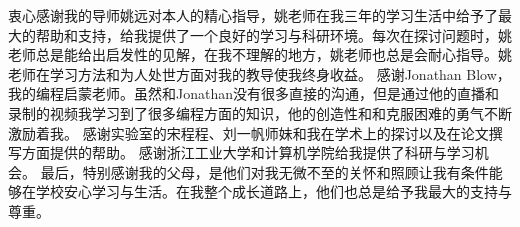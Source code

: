 
\begin{acknowledgements}
衷心感谢我的导师姚远对本人的精心指导，姚老师在我三年的学习生活中给予了最大的帮助和支持，给我提供了一个良好的学习与科研环境。每次在探讨问题时，姚老师总是能给出启发性的见解，在我不理解的地方，姚老师也总是会耐心指导。姚老师在学习方法和为人处世方面对我的教导使我终身收益。 
%
感谢Jonathan Blow，我的编程启蒙老师。虽然和Jonathan没有很多直接的沟通，但是通过他的直播和录制的视频我学习到了很多编程方面的知识，他的创造性和和克服困难的勇气不断激励着我。
%
感谢实验室的宋程程、刘一帆师妹和我在学术上的探讨以及在论文撰写方面提供的帮助。
%
感谢浙江工业大学和计算机学院给我提供了科研与学习机会。
%
最后，特别感谢我的父母，是他们对我无微不至的关怀和照顾让我有条件能够在学校安心学习与生活。在我整个成长道路上，他们也总是给予我最大的支持与尊重。
\end{acknowledgements}
